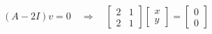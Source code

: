 \documentclass{article}
\begin{document}
\begin{align*}
(A - 2I)v = 0 \quad \Rightarrow \quad\begin{bmatrix} 2 & 1 \\ 2 & 1 \end{bmatrix}\begin{bmatrix} x \\ y \end{bmatrix}= \begin{bmatrix} 0 \\ 0 \end{bmatrix}
\end{align*}
\end{document}
